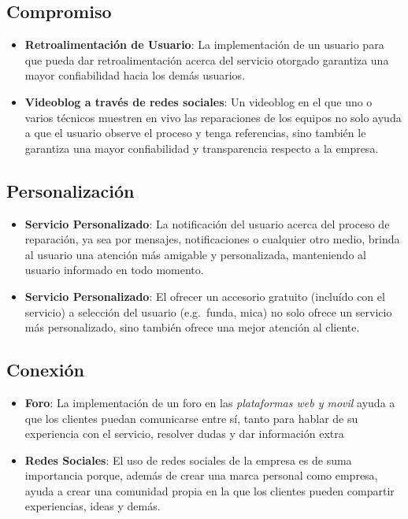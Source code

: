 	\subsection{Compromiso}

	\begin{itemize}
		\item \textbf{Retroalimentación de Usuario}: La implementación de
			un usuario para que pueda dar retroalimentación acerca del servicio
			otorgado garantiza una mayor confiabilidad hacia los demás usuarios.

		\item \textbf{Videoblog a través de redes sociales}: Un videoblog
			en el que uno o varios técnicos muestren en vivo las reparaciones
			de los equipos no solo ayuda a que el usuario observe el proceso
			y tenga referencias, sino también le garantiza una mayor
			confiabilidad y transparencia respecto a la empresa.
	\end{itemize}

	\subsection{Personalización}

	\begin{itemize}
		\item \textbf{Servicio Personalizado}: La notificación del usuario
			acerca del proceso de reparación, ya sea por mensajes, notificaciones
			o cualquier otro medio, brinda al usuario una atención más
			amigable y personalizada, manteniendo al usuario informado en todo
			momento.

		\item \textbf{Servicio Personalizado}: El ofrecer un accesorio gratuito
			(incluído con el servicio) a selección del usuario (e.g.~funda,
			mica) no solo ofrece un servicio más personalizado, sino
			también ofrece una mejor atención al cliente.
	\end{itemize}

	\subsection{Conexión}

	\begin{itemize}
		\item \textbf{Foro}: La implementación de un foro en las \emph{plataformas
			web y movil} ayuda a que los clientes puedan comunicarse entre
			sí, tanto para hablar de su experiencia con el servicio,
			resolver dudas y dar información extra

		\item \textbf{Redes Sociales}: El uso de redes sociales de la empresa
			es de suma importancia porque, además de crear una marca
			personal como empresa, ayuda a crear una comunidad propia en la
			que los clientes pueden compartir experiencias, ideas y demás.
	\end{itemize}

